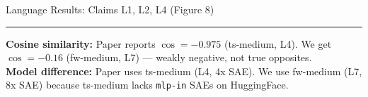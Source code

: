 \begin{frame}{Language Results: Claims L1, L2, L4 (Figure 8)}
    \vspace{0.1cm}
    \footnotesize
    \hspace{-0.3cm}
    \hfill
    \hfill
    
    \vspace{0.1cm}
    \hrule
    \vspace{0.05cm}
    \scriptsize
    \textbf{Cosine similarity:} Paper reports $\cos = -0.975$ (ts-medium, L4). We get $\cos = -0.16$ (fw-medium, L7) --- weakly negative, not true opposites.\\
    \textbf{Model difference:} Paper uses ts-medium (L4, 4x SAE). We use fw-medium (L7, 8x SAE) because ts-medium lacks \texttt{mlp-in} SAEs on HuggingFace.
\end{frame}


